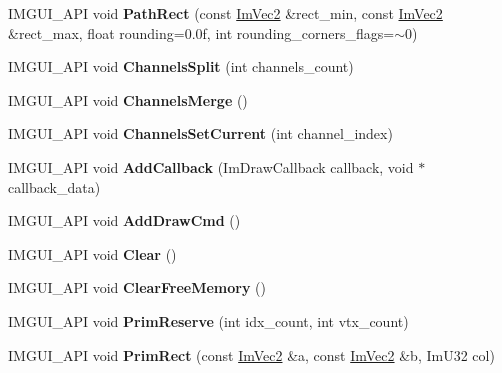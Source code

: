 \begin{DoxyCompactItemize}
I\+M\+G\+U\+I\+\_\+\+A\+PI void {\bfseries Path\+Rect} (const \hyperlink{struct_im_vec2}{Im\+Vec2} \&rect\+\_\+min, const \hyperlink{struct_im_vec2}{Im\+Vec2} \&rect\+\_\+max, float rounding=0.\+0f, int rounding\+\_\+corners\+\_\+flags=$\sim$0)
\item 
\mbox{\label{struct_im_draw_list_a426f124ba049bed2d38c850c65f9f917}} 
I\+M\+G\+U\+I\+\_\+\+A\+PI void {\bfseries Channels\+Split} (int channels\+\_\+count)
\item 
\mbox{\label{struct_im_draw_list_a2ed82c3f663cda520c90c55b94196274}} 
I\+M\+G\+U\+I\+\_\+\+A\+PI void {\bfseries Channels\+Merge} ()
\item 
\mbox{\label{struct_im_draw_list_a7de44b9fdfce65f32063ecad9306a191}} 
I\+M\+G\+U\+I\+\_\+\+A\+PI void {\bfseries Channels\+Set\+Current} (int channel\+\_\+index)
\item 
\mbox{\label{struct_im_draw_list_a14073d60ef9db9dc663dc7717a4893a5}} 
I\+M\+G\+U\+I\+\_\+\+A\+PI void {\bfseries Add\+Callback} (Im\+Draw\+Callback callback, void $\ast$callback\+\_\+data)
\item 
\mbox{\label{struct_im_draw_list_a846714bb0321c6f1f908767abc8559e6}} 
I\+M\+G\+U\+I\+\_\+\+A\+PI void {\bfseries Add\+Draw\+Cmd} ()
\item 
\mbox{\label{struct_im_draw_list_ac422590c71dc5593aea52f65793aee81}} 
I\+M\+G\+U\+I\+\_\+\+A\+PI void {\bfseries Clear} ()
\item 
\mbox{\label{struct_im_draw_list_a8b2686e006f57c554b709dfc47e2ad63}} 
I\+M\+G\+U\+I\+\_\+\+A\+PI void {\bfseries Clear\+Free\+Memory} ()
\item 
\mbox{\label{struct_im_draw_list_a879aa38dbfb0344e3e023d65c002c7d7}} 
I\+M\+G\+U\+I\+\_\+\+A\+PI void {\bfseries Prim\+Reserve} (int idx\+\_\+count, int vtx\+\_\+count)
\item 
\mbox{\label{struct_im_draw_list_ae2be093563f1d20b8190b7c423113925}} 
I\+M\+G\+U\+I\+\_\+\+A\+PI void {\bfseries Prim\+Rect} (const \hyperlink{struct_im_vec2}{Im\+Vec2} \&a, const \hyperlink{struct_im_vec2}{Im\+Vec2} \&b, Im\+U32 col)

\end{DoxyCompactItemize}
